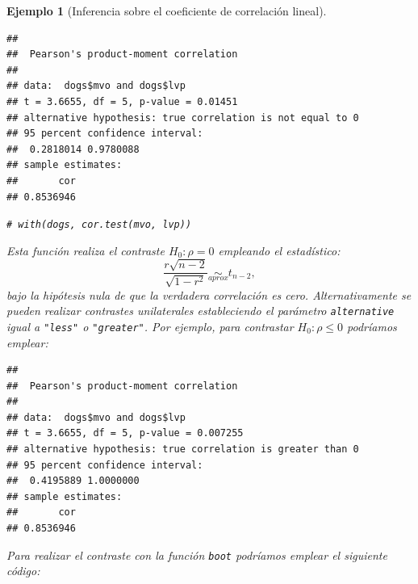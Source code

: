 \documentclass[
]{book}
\newenvironment{Shaded}{\begin{snugshade}}{\end{snugshade}}
\newcommand{\AttributeTok}[1]{\textcolor[rgb]{0.13,0.29,0.53}{#1}}
\newcommand{\CommentTok}[1]{\textcolor[rgb]{0.56,0.35,0.01}{\textit{#1}}}
\newcommand{\FunctionTok}[1]{\textcolor[rgb]{0.13,0.29,0.53}{\textbf{#1}}}
\newcommand{\NormalTok}[1]{#1}
\newcommand{\SpecialCharTok}[1]{\textcolor[rgb]{0.81,0.36,0.00}{\textbf{#1}}}
\newcommand{\StringTok}[1]{\textcolor[rgb]{0.31,0.60,0.02}{#1}}
\theoremstyle{break}
\newtheorem{example}{Ejemplo}[chapter]
\theoremstyle{nonumberplain}
\renewcommand{\CommentTok}[1]{\textcolor[rgb]{0.41,0.41,0.41}{\texttt{#1}}}
\begin{document}
\begin{example}[Inferencia sobre el coeficiente de correlación lineal]
\begin{Shaded}
\end{Shaded}

\begin{verbatim}
## 
##  Pearson's product-moment correlation
## 
## data:  dogs$mvo and dogs$lvp
## t = 3.6655, df = 5, p-value = 0.01451
## alternative hypothesis: true correlation is not equal to 0
## 95 percent confidence interval:
##  0.2818014 0.9780088
## sample estimates:
##       cor 
## 0.8536946
\end{verbatim}

\begin{Shaded}
\begin{Highlighting}[]
\CommentTok{\# with(dogs, cor.test(mvo, lvp))}
\end{Highlighting}
\end{Shaded}

Esta función realiza el contraste \(H_0: \rho = 0\) empleando el estadístico:
\[\frac{r\sqrt{n - 2}}{\sqrt{1 - r^2}} \underset{aprox}{\sim } t_{n-2},\]
bajo la hipótesis nula de que la verdadera correlación es cero.
Alternativamente se pueden realizar contrastes unilaterales estableciendo
el parámetro \texttt{alternative} igual a \texttt{"less"} o \texttt{"greater"}.
Por ejemplo, para contrastar \(H_0: \rho \leq 0\) podríamos emplear:

\begin{Shaded}
\end{Shaded}

\begin{verbatim}
## 
##  Pearson's product-moment correlation
## 
## data:  dogs$mvo and dogs$lvp
## t = 3.6655, df = 5, p-value = 0.007255
## alternative hypothesis: true correlation is greater than 0
## 95 percent confidence interval:
##  0.4195889 1.0000000
## sample estimates:
##       cor 
## 0.8536946
\end{verbatim}

Para realizar el contraste con la función \texttt{boot} podríamos
emplear el siguiente código:


\end{example}
\end{document}
